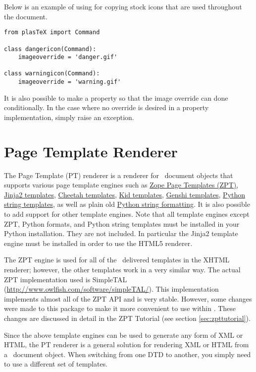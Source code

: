 Below is an example of using  for copying 
stock icons that are used throughout the document.
\begin{verbatim}
from plasTeX import Command

class dangericon(Command):
    imageoverride = 'danger.gif'

class warningicon(Command):
    imageoverride = 'warning.gif'
\end{verbatim}

It is also possible to make  a property
so that the image override can done conditionally.  In the case
where no override is desired in a property implementation, simply
raise an  exception.

\section{Page Template Renderer\label{sec:zpt}}

The Page Template (PT) renderer is a renderer for \plasTeX\ document
objects that supports various page template engines such as 
\href{http://www.zope.org/Documentation/Books/ZopeBook/2_6Edition/ZPT.stx}{Zope
Page Templates (ZPT)}, \href{http://jinja.pocoo.org/}{Jinja2 templates},
\href{http://www.cheetahtemplate.org/}{Cheetah templates}, 
\href{http://kid-templating.org/}{Kid templates}, 
\href{http://genshi.edgewall.org/}{Genshi templates}, 
\href{http://docs.python.org/lib/node40.html}{Python string templates}, 
as well as plain old \href{http://docs.python.org/lib/typesseq-strings.html}{Python string formatting}.  It is also possible to add support for other 
template engines.  Note that all template engines except ZPT, Python formats, 
and Python string templates must be installed in your Python installation. 
They are not included. In particular the Jinja2 template engine must be
installed in order to use the HTML5 renderer.

The ZPT engine is used for all of the \plasTeX\ delivered templates
in the XHTML renderer; however, the other templates work in a very similar way.
The actual ZPT implementation used is SimpleTAL 
(\url{http://www.owlfish.com/software/simpleTAL/}).  This implementation
implements almost all of the ZPT API and is very stable.  However, some
changes were made to this package to make it more convenient to use
within \plasTeX.  These changes are discussed in detail in the 
ZPT Tutorial (see section \ref{sec:zpttutorial}).

Since the above template engines can be used to generate any form of 
XML or HTML, the PT
renderer is a general solution for rendering XML or HTML from a 
\plasTeX\ document object.  When switching from one DTD to another, 
you simply need to use a different set of templates.


